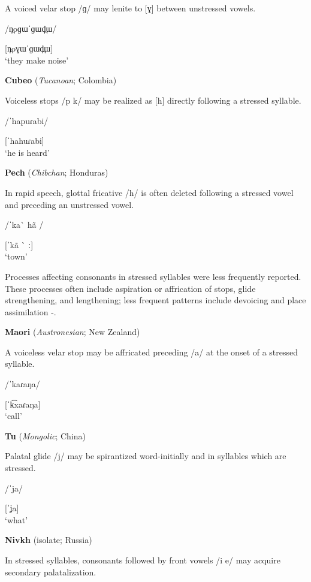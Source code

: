 A voiced velar stop /ɡ/ may lenite to [ɣ] between unstressed vowels.

/n̪oɡɯˈɡɯd̪ɯ/

[n̪oɣɯˈɡɯd̪ɯ]\\
\glt ‘they make noise’
\citep[27]{Donohue1999}
\z

\ea\label{ex:5.20}
  \textbf{Cubeo} (\textit{Tucanoan}; Colombia)

Voiceless stops /p k/ may be realized as [h] directly following a stressed syllable.

/ˈhapuɾabi/

[ˈhahuɾabi]\\
\glt ‘he is heard’
\citep[123]{Chacon2012}
\z

\ea\label{ex:5.21}
  \textbf{Pech} (\textit{Chibchan}; Honduras)

In rapid speech, glottal fricative /h/ is often deleted following a stressed vowel and preceding an unstressed vowel.

/ˈka\`{} hã /

[ˈkã \`{} ː]\\
\glt ‘town’
\citep[24]{Holt1999}
\z

  Processes affecting consonants in stressed syllables were less frequently reported. These processes often include aspiration or affrication of stops, glide strengthening, and lengthening; less frequent patterns include devoicing and place assimilation -.

\ea\label{ex:5.22}
  \textbf{Maori} (\textit{Austronesian}; New Zealand)

A voiceless velar stop may be affricated preceding /a/ at the onset of a stressed syllable.

/ˈkaɾaŋa/

[ˈk͡xaɾaŋa]\\
\glt ‘call’
\citep[521-2]{Bauer1999}
\z

\ea\label{ex:5.23}
  \textbf{Tu} (\textit{Mongolic}; China)

Palatal glide /j/ may be spirantized word-initially and in syllables which are stressed.

/ˈja/

[ˈʝa]\\
\glt ‘what’
\citep[31-2]{Slater2003}
\z

\ea\label{ex:5.24}
  \textbf{Nivkh} (isolate; Russia)

In stressed syllables, consonants followed by front vowels /i e/ may acquire secondary palatalization.

